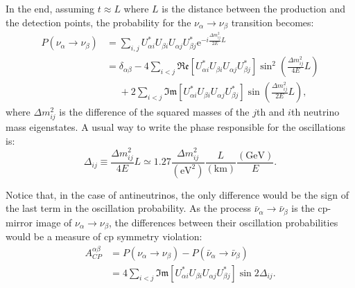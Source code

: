 In the end, assuming $t \approx L$ where $L$ is the distance between the production and the detection points, the probability for the $\nu_{\alpha} \rightarrow \nu_{\beta}$ transition becomes:
\begin{equation}
\begin{split}
P(\nu_{\alpha} \rightarrow \nu_{\beta}) &= \sum_{i,j} U^{*}_{\alpha i} U_{\beta i} U_{\alpha j} U^{*}_{\beta j} \mathrm{e}^{-i\frac{\Delta m^{2}_{ij}}{2E}L}\\
&=\delta_{\alpha\beta} - 4 \sum_{i<j} \mathfrak{Re}\left[U^{*}_{\alpha i} U_{\beta i} U_{\alpha j} U^{*}_{\beta j}\right] \sin^{2}\left(\frac{\Delta m^{2}_{ij}}{4E}L\right)\\
&\phantom{=}+ 2  \sum_{i<j} \mathfrak{Im}\left[U^{*}_{\alpha i} U_{\beta i} U_{\alpha j} U^{*}_{\beta j}\right] \sin\left(\frac{\Delta m^{2}_{ij}}{2E}L\right),
\end{split}
\end{equation}
where $\Delta m^{2}_{ij}$ is the difference of the squared masses of the $j$th and $i$th neutrino mass eigenstates. A usual way to write the phase responsible for the oscillations is:
\begin{equation}\label{eq:oscillation_term}
\Delta_{ij} \equiv \frac{\Delta m^{2}_{ij}}{4E}L \simeq 1.27 \frac{\Delta m^{2}_{ij}}{(\mathrm{eV}^{2})} \frac{L}{(\mathrm{km})} \frac{(\mathrm{GeV})}{E}.
\end{equation}

Notice that, in the case of antineutrinos, the only difference would be the sign of the last term in the oscillation probability. As the process $\bar{\nu}_{\alpha} \rightarrow \bar{\nu}_{\beta}$ is the \gls{cp}-mirror image of $\nu_{\alpha} \rightarrow \nu_{\beta}$, the differences between their oscillation probabilities would be a measure of \gls{cp} symmetry violation:
\begin{equation}\label{eq:cp_asymmetry}
\begin{split}
A^{\alpha\beta}_{CP}&=P(\nu_{\alpha} \rightarrow \nu_{\beta})-P(\bar{\nu}_{\alpha} \rightarrow \bar{\nu}_{\beta})\\
&=4  \sum_{i<j} \mathfrak{Im}\left[U^{*}_{\alpha i} U_{\beta i} U_{\alpha j} U^{*}_{\beta j}\right] \sin 2\Delta_{ij}.
\end{split}
\end{equation}


